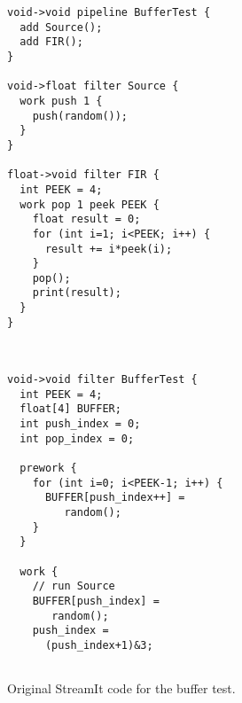\begin{figure}[t]

\begin{minipage}{1.6in}
\centering
{\scriptsize
\begin{verbatim}
void->void pipeline BufferTest {
  add Source();                 
  add FIR();                    
}                               
                                
void->float filter Source {     
  work push 1 {                 
    push(random());             
  }                             
}                               
                                
float->void filter FIR {        
  int PEEK = 4;                 
  work pop 1 peek PEEK {        
    float result = 0;           
    for (int i=1; i<PEEK; i++) {
      result += i*peek(i);      
    }                           
    pop();                      
    print(result);              
  }                             
}                               
\end{verbatim}}
\vspace{-6pt}

\caption{Original StreamIt code for the buffer test.\protect\label{fig:code-orig}}
\end{minipage}
~~\vrule~
\begin{minipage}{1.5in}
{\scriptsize
\begin{verbatim}
void->void filter BufferTest {       
  int PEEK = 4;                      
  float[4] BUFFER;                   
  int push_index = 0;                
  int pop_index = 0;                 
                                     
  prework {                          
    for (int i=0; i<PEEK-1; i++) {   
      BUFFER[push_index++] =         
         random();                   
    }                                
  }                                  
                                     
  work {                             
    // run Source                    
    BUFFER[push_index] =             
       random();                     
    push_index =                     
      (push_index+1)&3;              
                                     

\end{verbatim}}
\end{minipage}
\end{figure}
